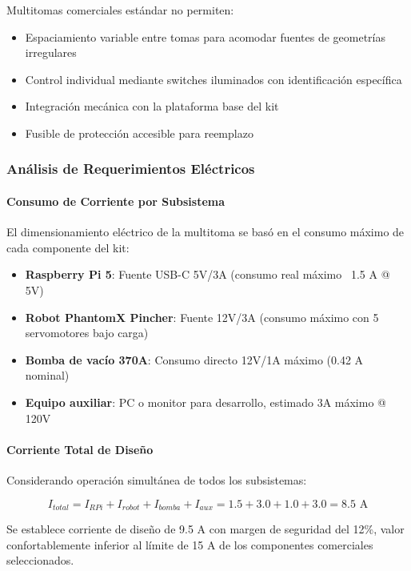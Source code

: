 Multitomas comerciales estándar no permiten:
\begin{itemize}
    \item Espaciamiento variable entre tomas para acomodar fuentes de geometrías irregulares
    \item Control individual mediante switches iluminados con identificación específica
    \item Integración mecánica con la plataforma base del kit
    \item Fusible de protección accesible para reemplazo
\end{itemize}

\subsubsection{Análisis de Requerimientos Eléctricos}

\paragraph{Consumo de Corriente por Subsistema}

El dimensionamiento eléctrico de la multitoma se basó en el consumo máximo de cada componente del kit:

\begin{itemize}
    \item \textbf{Raspberry Pi 5}: Fuente USB-C 5V/3A (consumo real máximo ~1.5 A @ 5V)
    \item \textbf{Robot PhantomX Pincher}: Fuente 12V/3A (consumo máximo con 5 servomotores bajo carga)
    \item \textbf{Bomba de vacío 370A}: Consumo directo 12V/1A máximo (0.42 A nominal)
    \item \textbf{Equipo auxiliar}: PC o monitor para desarrollo, estimado 3A máximo @ 120V
\end{itemize}

\paragraph{Corriente Total de Diseño}

Considerando operación simultánea de todos los subsistemas:

\begin{equation}
I_{total} = I_{RPi} + I_{robot} + I_{bomba} + I_{aux} = 1.5 + 3.0 + 1.0 + 3.0 = 8.5 \text{ A}
\end{equation}

Se establece corriente de diseño de 9.5 A con margen de seguridad del 12\%, valor confortablemente inferior al límite de 15 A de los componentes comerciales seleccionados.

